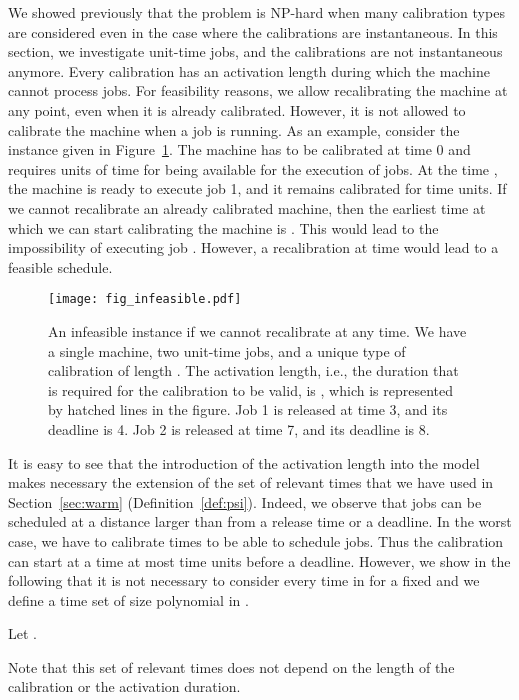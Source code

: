 We showed previously that the problem is NP-hard when many calibration types are considered even in the case where the calibrations are instantaneous. In this section, we investigate unit-time jobs, and the calibrations are not instantaneous anymore. Every calibration has an activation length  during which the machine cannot process jobs. For feasibility reasons, we allow recalibrating the machine at any point, even when it is already calibrated. However, it is not allowed to calibrate the machine when a job is running. As an example, consider the instance given in Figure~\ref{fig:infeasible}.  The machine has to be calibrated at time 0 and requires  units of time for being available for the execution of jobs. At the time , the machine is ready to execute job 1, and it remains calibrated for  time units. If we cannot recalibrate an already calibrated machine, then the earliest time at which we can start calibrating the machine is . This would lead to the impossibility of executing job . However, a recalibration at time  would lead to a feasible schedule.
\begin{figure}[ht]
\centering
\texttt{[image: fig\_infeasible.pdf]}
\caption{An infeasible instance if we cannot recalibrate at any time. We have a single machine, two unit-time jobs, and a unique type of calibration of length . The activation length, i.e., the duration that is required for the calibration to be valid, is , which is represented by hatched lines in the figure. Job 1 is released at time 3, and its deadline is 4. Job 2 is released at time 7, and its deadline is 8.}
\label{fig:infeasible}
\end{figure}


It is easy to see that the introduction of the activation length into the model makes necessary the extension of the set  of relevant times that we have used in Section~\ref{sec:warm} (Definition~\ref{def:psi}). Indeed, we observe that jobs can be scheduled at a distance larger than  from a release time or a deadline. 
In the worst case, we have to calibrate  times to be able to schedule  jobs. Thus the calibration can start at a time at most  time units before a deadline. However, we show in the following that it is not necessary to consider every time in  for a fixed  and we define a time set of size polynomial in .




\begin{definition}
Let .
\end{definition}

Note that this set of relevant times does not depend on the length of the calibration or the activation duration.



